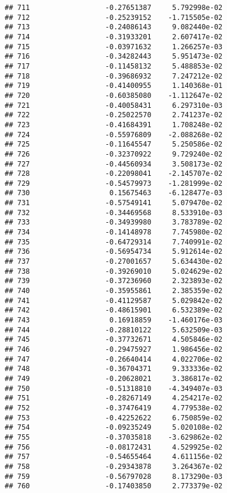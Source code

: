 \documentclass[
]{article}
\begin{document}
\begin{verbatim}
## 711                  -0.27651387     5.792998e-02
## 712                  -0.25239152    -1.715505e-02
## 713                  -0.24086143     9.082440e-02
## 714                  -0.31933201     2.607417e-02
## 715                  -0.03971632     1.266257e-03
## 716                  -0.34282443     5.951473e-02
## 717                  -0.11458132     5.488853e-02
## 718                  -0.39686932     7.247212e-02
## 719                  -0.41400955     1.140368e-01
## 720                  -0.60385080    -1.112647e-02
## 721                  -0.40058431     6.297310e-03
## 722                  -0.25022570     2.741237e-02
## 723                  -0.41684391     1.708248e-02
## 724                  -0.55976809    -2.088268e-02
## 725                  -0.11645547     5.250586e-02
## 726                  -0.32370922     9.729240e-02
## 727                  -0.44560934     3.508173e-02
## 728                  -0.22098041    -2.145707e-02
## 729                  -0.54579973    -1.281999e-02
## 730                   0.15675463    -6.128477e-03
## 731                  -0.57549141     5.079470e-02
## 732                  -0.34469568     8.533910e-03
## 733                  -0.34939980     3.783789e-02
## 734                  -0.14148978     7.745980e-02
## 735                  -0.64729314     7.740991e-02
## 736                  -0.56954734     5.912614e-02
## 737                  -0.27001657     5.634430e-02
## 738                  -0.39269010     5.024629e-02
## 739                  -0.37236960     2.323893e-02
## 740                  -0.35955861     2.385359e-02
## 741                  -0.41129587     5.029842e-02
## 742                  -0.48615901     6.532389e-02
## 743                   0.16918859    -1.460176e-03
## 744                  -0.28810122     5.632509e-03
## 745                  -0.37732671     4.505846e-02
## 746                  -0.29475927     1.986456e-02
## 747                  -0.26640414     4.022706e-02
## 748                  -0.36704371     9.333336e-02
## 749                  -0.20628021     3.386817e-02
## 750                  -0.51318810    -4.349407e-03
## 751                  -0.28267149     4.254217e-02
## 752                  -0.37476419     4.779538e-02
## 753                  -0.42252622     6.750859e-02
## 754                  -0.09235249     5.020108e-02
## 755                  -0.37035818    -3.629862e-02
## 756                  -0.08172431     4.529925e-02
## 757                  -0.54655464     4.611156e-02
## 758                  -0.29343878     3.264367e-02
## 759                  -0.56797028     8.173290e-03
## 760                  -0.17403850     2.773379e-02

\end{verbatim}
\end{document}
